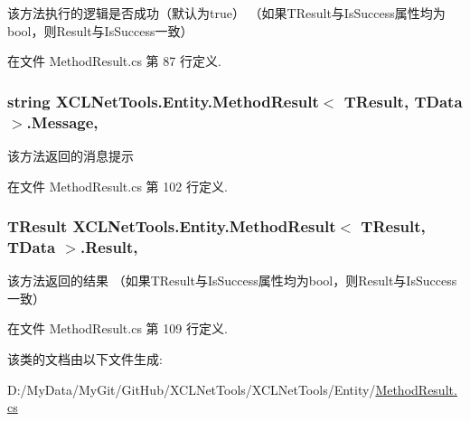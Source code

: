 该方法执行的逻辑是否成功（默认为true） （如果\-T\-Result与\-Is\-Success属性均为bool，则\-Result与\-Is\-Success一致） 



在文件 Method\-Result.\-cs 第 87 行定义.

\hypertarget{class_x_c_l_net_tools_1_1_entity_1_1_method_result_3_01_t_result_00_01_t_data_01_4_a42b60daad9e9c8918d166bb532715415}{
\subsubsection[{Message}]{\setlength{\rightskip}{0pt plus 5cm}string X\-C\-L\-Net\-Tools.\-Entity.\-Method\-Result$<$ T\-Result, T\-Data $>$.Message\hspace{0.3cm}{\ttfamily [get]}, {\ttfamily [set]}}}\label{class_x_c_l_net_tools_1_1_entity_1_1_method_result_3_01_t_result_00_01_t_data_01_4_a42b60daad9e9c8918d166bb532715415}


该方法返回的消息提示 



在文件 Method\-Result.\-cs 第 102 行定义.

\hypertarget{class_x_c_l_net_tools_1_1_entity_1_1_method_result_3_01_t_result_00_01_t_data_01_4_a5ada3fa6bfeaf5e9a531225071c9700f}{
\subsubsection[{Result}]{\setlength{\rightskip}{0pt plus 5cm}T\-Result X\-C\-L\-Net\-Tools.\-Entity.\-Method\-Result$<$ T\-Result, T\-Data $>$.Result\hspace{0.3cm}{\ttfamily [get]}, {\ttfamily [set]}}}\label{class_x_c_l_net_tools_1_1_entity_1_1_method_result_3_01_t_result_00_01_t_data_01_4_a5ada3fa6bfeaf5e9a531225071c9700f}


该方法返回的结果 （如果\-T\-Result与\-Is\-Success属性均为bool，则\-Result与\-Is\-Success一致） 



在文件 Method\-Result.\-cs 第 109 行定义.



该类的文档由以下文件生成\-:\begin{DoxyCompactItemize}
\item 
D\-:/\-My\-Data/\-My\-Git/\-Git\-Hub/\-X\-C\-L\-Net\-Tools/\-X\-C\-L\-Net\-Tools/\-Entity/\hyperlink{_method_result_8cs}{Method\-Result.\-cs}\end{DoxyCompactItemize}
